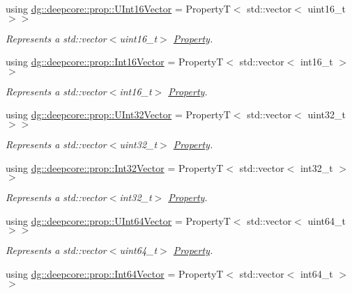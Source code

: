 \begin{DoxyCompactItemize}
using \hyperlink{group___process_properties_ga898c614111f39f3f942b385477705460}{dg\+::deepcore\+::prop\+::\+U\+Int16\+Vector} = PropertyT$<$ std\+::vector$<$ uint16\+\_\+t $>$$>$
\begin{DoxyCompactList}\small\item\em Represents a {\ttfamily std\+::vector$<$uint16\+\_\+t$>$} \hyperlink{classdg_1_1deepcore_1_1_property}{Property}. \end{DoxyCompactList}\item 
using \hyperlink{group___process_properties_gaa9edeb8c24adefc69d465f4b95b2ad77}{dg\+::deepcore\+::prop\+::\+Int16\+Vector} = PropertyT$<$ std\+::vector$<$ int16\+\_\+t $>$$>$
\begin{DoxyCompactList}\small\item\em Represents a {\ttfamily std\+::vector$<$int16\+\_\+t$>$} \hyperlink{classdg_1_1deepcore_1_1_property}{Property}. \end{DoxyCompactList}\item 
using \hyperlink{group___process_properties_ga7cc75489500ae42aa3122aadd51d3441}{dg\+::deepcore\+::prop\+::\+U\+Int32\+Vector} = PropertyT$<$ std\+::vector$<$ uint32\+\_\+t $>$$>$
\begin{DoxyCompactList}\small\item\em Represents a {\ttfamily std\+::vector$<$uint32\+\_\+t$>$} \hyperlink{classdg_1_1deepcore_1_1_property}{Property}. \end{DoxyCompactList}\item 
using \hyperlink{group___process_properties_gaa7c9adb7a8c1d38311c39122a846e5d8}{dg\+::deepcore\+::prop\+::\+Int32\+Vector} = PropertyT$<$ std\+::vector$<$ int32\+\_\+t $>$$>$
\begin{DoxyCompactList}\small\item\em Represents a {\ttfamily std\+::vector$<$int32\+\_\+t$>$} \hyperlink{classdg_1_1deepcore_1_1_property}{Property}. \end{DoxyCompactList}\item 
using \hyperlink{group___process_properties_gaea3792697747e659ee84e99497f27834}{dg\+::deepcore\+::prop\+::\+U\+Int64\+Vector} = PropertyT$<$ std\+::vector$<$ uint64\+\_\+t $>$$>$
\begin{DoxyCompactList}\small\item\em Represents a {\ttfamily std\+::vector$<$uint64\+\_\+t$>$} \hyperlink{classdg_1_1deepcore_1_1_property}{Property}. \end{DoxyCompactList}\item 
using \hyperlink{group___process_properties_gab516177437a5ae217122405549846532}{dg\+::deepcore\+::prop\+::\+Int64\+Vector} = PropertyT$<$ std\+::vector$<$ int64\+\_\+t $>$$>$

\end{DoxyCompactItemize}
